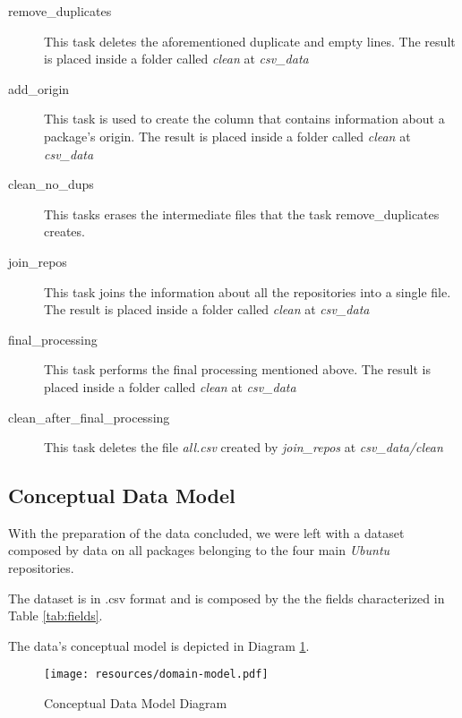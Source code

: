 \begin{description}
    \item[remove\_duplicates] This task deletes the aforementioned duplicate and empty lines. The result is placed inside a folder called \textit{clean} at \textit{csv\_data}
    
    \item[add\_origin] This task is used to create the column that contains information about a package's origin. The result is placed inside a folder called \textit{clean} at \textit{csv\_data}
    
    \item[clean\_no\_dups] This tasks erases the intermediate files that the task remove\_duplicates creates.
    
    \item[join\_repos] This task joins the information about all the repositories into a single file. The result is placed inside a folder called \textit{clean} at \textit{csv\_data}
    
    \item[final\_processing] This task performs the final processing mentioned above. The result is placed inside a folder called \textit{clean} at \textit{csv\_data}
    
    \item[clean\_after\_final\_processing] This task deletes the file \textit{all.csv} created by \textit{join\_repos} at \textit{csv\_data/clean}
\end{description}

\subsection{Conceptual Data Model}

With the preparation of the data concluded, we were left with a dataset composed by data on all packages belonging to the four main \emph{Ubuntu} repositories.

The dataset is in .csv format and is composed by the the fields characterized in Table \ref{tab:fields}.

The data's conceptual model is depicted in Diagram \ref{fig:data-mode-diagram}.


\begin{figure}
    \centering
    \texttt{[image: resources/domain-model.pdf]}
    \caption{Conceptual Data Model Diagram}
    \label{fig:data-mode-diagram}
\end{figure}
